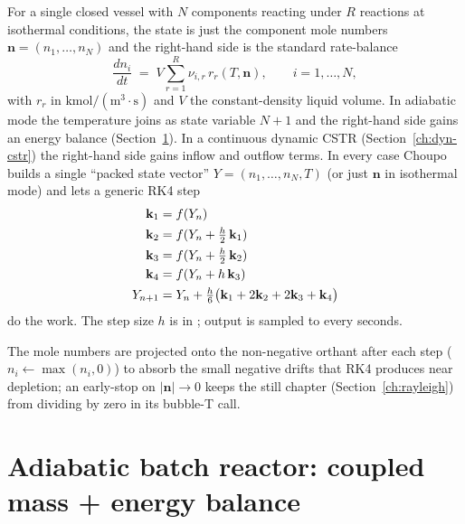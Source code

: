 \documentclass[11pt,a4paper]{article}
\newcommand{\nv}{\mathbf{n}}                          %
\begin{document}
For a single closed vessel with $N$ components reacting under
$R$ reactions at isothermal conditions, the state is just the
component mole numbers $\nv = (n_1, \ldots, n_N)$ and the
right-hand side is the standard rate-balance
\begin{equation}
    \frac{d n_i}{dt}
    \;=\; V \sum_{r=1}^{R} \nu_{i,r}\, r_r(T, \nv),
    \qquad i = 1, \ldots, N,
    \label{eq:batch-mass-iso}
\end{equation}
with $r_r$ in $\mathrm{kmol/(m^3 \cdot s)}$ and $V$ the
constant-density liquid volume.  In adiabatic mode the temperature
joins as state variable $N{+}1$ and the right-hand side gains an
energy balance (Section~\ref{ch:batch-adiabatic}).  In a continuous
dynamic CSTR (Section~\ref{ch:dyn-cstr}) the right-hand side gains
inflow and outflow terms.  In every case Choupo builds a single
``packed state vector'' $Y = (n_1, \ldots, n_N, T)$ (or just $\nv$
in isothermal mode) and lets a generic RK4 step
\begin{align}
    \mathbf{k}_1 &= f(Y_n)                                      \notag\\
    \mathbf{k}_2 &= f(Y_n + \tfrac{h}{2}\,\mathbf{k}_1)         \notag\\
    \mathbf{k}_3 &= f(Y_n + \tfrac{h}{2}\,\mathbf{k}_2)         \notag\\
    \mathbf{k}_4 &= f(Y_n + h\,\mathbf{k}_3)                    \notag\\
    Y_{n+1} &= Y_n + \tfrac{h}{6}\bigl(\mathbf{k}_1 + 2\mathbf{k}_2 + 2\mathbf{k}_3 + \mathbf{k}_4\bigr)
    \label{eq:rk4-packed}
\end{align}
do the work.  The step size $h$ is  in
; output is sampled to  every
 seconds.

The mole numbers are projected onto the non-negative orthant after
each step ($n_i \leftarrow \max(n_i, 0)$) to absorb the small
negative drifts that RK4 produces near depletion; an early-stop on
$|\nv|\to 0$ keeps the still chapter (Section~\ref{ch:rayleigh})
from dividing by zero in its bubble-T call.

\section{Adiabatic batch reactor: coupled mass + energy balance}\label{ch:batch-adiabatic}
\end{document}
